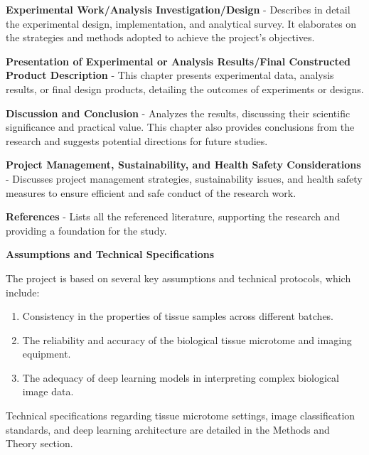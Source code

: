 \textbf{Experimental Work/Analysis Investigation/Design} - Describes in detail the experimental design, implementation, and analytical survey. It elaborates on the strategies and methods adopted to achieve the project's objectives.

\textbf{Presentation of Experimental or Analysis Results/Final Constructed Product Description} - This chapter presents experimental data, analysis results, or final design products, detailing the outcomes of experiments or designs.

\textbf{Discussion and Conclusion} - Analyzes the results, discussing their scientific significance and practical value. This chapter also provides conclusions from the research and suggests potential directions for future studies.

\textbf{Project Management, Sustainability, and Health Safety Considerations} - Discusses project management strategies, sustainability issues, and health safety measures to ensure efficient and safe conduct of the research work.

\textbf{References} - Lists all the referenced literature, supporting the research and providing a foundation for the study.



\textbf{Assumptions and Technical Specifications}

The project is based on several key assumptions and technical protocols, which include:

\begin{enumerate}
    \item Consistency in the properties of tissue samples across different batches.
    \item The reliability and accuracy of the biological tissue microtome and imaging equipment.
    \item The adequacy of deep learning models in interpreting complex biological image data.
\end{enumerate}

Technical specifications regarding tissue microtome settings, image classification standards, and deep learning architecture are detailed in the Methods and Theory section.



